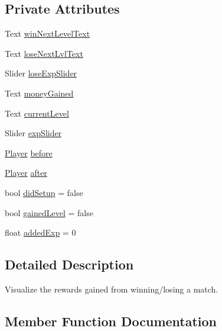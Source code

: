 \subsection*{Private Attributes}
\begin{DoxyCompactItemize}
\item 
Text \mbox{\hyperlink{class_win_lose_popup_ae36d60eb365ca9331d068e354a13eb00}{win\+Next\+Level\+Text}}
\item 
Text \mbox{\hyperlink{class_win_lose_popup_a2d14509aafa2672bffa70812b7fd8feb}{lose\+Next\+Lvl\+Text}}
\item 
Slider \mbox{\hyperlink{class_win_lose_popup_ab14cf5e3153f0c51bacc94f0dc7de77e}{lose\+Exp\+Slider}}
\item 
Text \mbox{\hyperlink{class_win_lose_popup_adbc1922aff99c3b3fa585a4e7f124e13}{money\+Gained}}
\item 
Text \mbox{\hyperlink{class_win_lose_popup_a3b0146c33af33ccf52b4404052896bb9}{current\+Level}}
\item 
Slider \mbox{\hyperlink{class_win_lose_popup_afef81efb95018e4cbe2505da1c5a3ab3}{exp\+Slider}}
\item 
\mbox{\hyperlink{class_player}{Player}} \mbox{\hyperlink{class_win_lose_popup_a7201ba527ce8ca90adf383224c89c2d3}{before}}
\item 
\mbox{\hyperlink{class_player}{Player}} \mbox{\hyperlink{class_win_lose_popup_a5da1387cc4bb2efb52708a85b5a70685}{after}}
\item 
bool \mbox{\hyperlink{class_win_lose_popup_adaa6d1028fb44efd4fe50993ae35c9f1}{did\+Setup}} = false
\item 
bool \mbox{\hyperlink{class_win_lose_popup_adf087a11d92bb33525095c666db98b15}{gained\+Level}} = false
\item 
float \mbox{\hyperlink{class_win_lose_popup_a24495c1926e8cf1d2284204629e8ce78}{added\+Exp}} = 0
\end{DoxyCompactItemize}


\subsection{Detailed Description}
Visualize the rewards gained from winning/losing a match. 

\subsection{Member Function Documentation}
\mbox{\label{class_win_lose_popup_a93530da059106189d5c41afff35bca9d}} 
